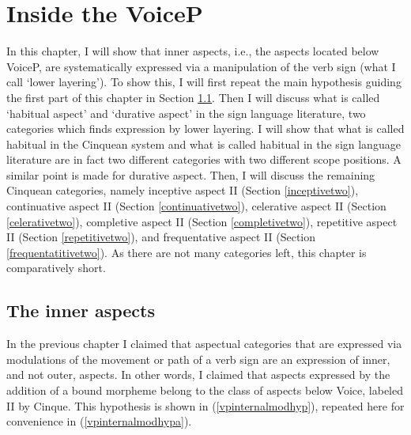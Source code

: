 \chapter{Inside the VoiceP}\label{insidevp}
In this chapter, I will show that inner aspects, i.e., the aspects located below VoiceP, are systematically expressed via a manipulation of the verb sign (what I call `lower layering'). To show this, I will first repeat the main hypothesis guiding the first part of this chapter in Section \ref{inneraspects}. Then I will discuss what is called `habitual aspect' and `durative aspect' in the sign language literature, two categories which finds expression by lower layering. I will show that what is called habitual in the Cinquean system and what is called habitual in the sign language literature are in fact two different categories with two different scope positions. A similar point is made for durative aspect. Then, I will discuss the remaining Cinquean categories, namely inceptive aspect II (Section \ref{inceptivetwo}), continuative aspect II (Section \ref{continuativetwo}), celerative aspect II (Section \ref{celerativetwo}), completive aspect II (Section \ref{completivetwo}), repetitive aspect II (Section \ref{repetitivetwo}), and frequentative aspect II (Section \ref{frequentatitivetwo}). As there are not many categories left, this chapter is comparatively short. 


\section{The inner aspects}\label{inneraspects}

In the previous chapter I claimed that aspectual categories that are expressed via modulations of the movement or path of a verb sign are an expression of inner, and not outer, aspects. In other words, I claimed that aspects expressed by the addition of a bound morpheme belong to the class of aspects below Voice, labeled II by Cinque. This hypothesis is shown in (\ref{vpinternalmodhyp}), repeated here for convenience in (\ref{vpinternalmodhypa}).

